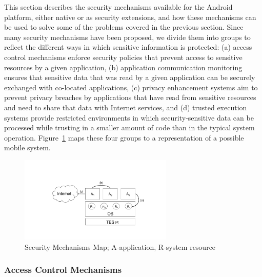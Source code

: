 This section describes the security mechanisms available for the Android platform, either native or as security extensions, and how these mechanisms can be used to solve some of the problems covered in the previous section. Since many security mechanisms have been proposed, we divide them into groups to reflect the different ways in which sensitive information is protected: (a) access control mechanisms enforce security policies that prevent access to sensitive resources by a given application, (b) application communication monitoring ensures that sensitive data that was read by a given application can be securely exchanged with co-located applications, (c) privacy enhancement systems aim to prevent privacy breaches by applications that have read from sensitive resources and need to share that data with Internet services, and (d) trusted execution systems provide restricted environments in which security-sensitive data can be processed while trusting in a smaller amount of code than in the typical system operation. Figure~\ref{fig:relwork} maps these four groups to a representation of a possible mobile system.


\begin{figure}[t!]
	\centering
	\includegraphics[width=0.65\textwidth]{img/relwork.pdf}
	\caption{Security Mechanisms Map; A-application, R-system resource}
	\label{fig:relwork}
\end{figure}

\subsubsection{Access Control Mechanisms}


